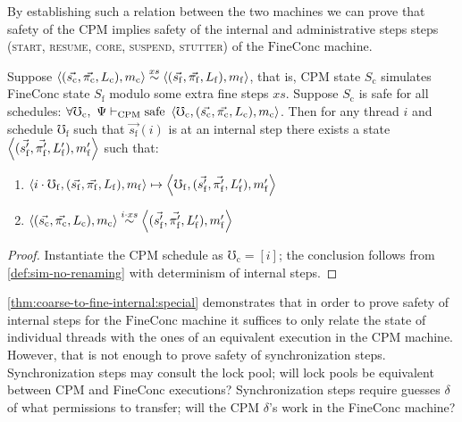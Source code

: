 By establishing such a relation between the two machines we can prove
that safety of the $\mathrm{CPM}$ implies safety of the internal and administrative steps
steps (\textsc{start, resume, core, suspend, stutter})
 of the $\mathrm{FineConc}$ machine.

\begin{lemma}
  \label{thm:coarse-to-fine-internal:special}
  Suppose
  $\left<(\vec{s_\mathrm{c}}, \vec{\pi_\mathrm{c}},
    L_\mathrm{c}), m_\mathrm{c} \right>
  \stackrel{xs}{\sim} \left<(\vec{s_\mathrm{f}},
  \vec{\pi_\mathrm{f}}, L_\mathrm{f}), m_\mathrm{f}\right>$,
  that is,
  CPM state $S_\mathrm{c}$ simulates FineConc state $S_\mathrm{f}$
  modulo some extra fine steps $xs$.
   Suppose $S_\mathrm{c}$ is safe for all schedules:\newline
  $\forall \mho_\mathrm{c},~ \Psi \vdash_\mathrm{CPM}
  \mathrm{safe}~\left<\mho_\mathrm{c},(\vec{s_\mathrm{c}},\vec{\pi_\mathrm{c}},L_\mathrm{c}),m_\mathrm{c}\right>$.
  Then for any thread $i$ and schedule
  $\mho_\mathrm{f}$ such that $\vec{s_\mathrm{f}}(i)$ is at an
  internal step there exists a state
  $\left<(\vec{s'_\mathrm{f}}, \vec{\pi'_\mathrm{f}},
    L'_\mathrm{f}), m'_\mathrm{f}\right>$
  such that:
  \begin{enumerate}[topsep=0pt]
  \item
    $\left<i\cdot\mho_{\mathrm{f}},(\vec{s_\mathrm{f}},
      \vec{\pi_\mathrm{f}}, L_\mathrm{f}), m_\mathrm{f}\right>
    \mapsto \left<\mho_{\mathrm{f}},(\vec{s'_\mathrm{f}},
      \vec{\pi'_\mathrm{f}}, L'_\mathrm{f}),
      m'_\mathrm{f}\right>$
  \item
    $\left<(\vec{s_\mathrm{c}}, \vec{\pi_\mathrm{c}},
      L_\mathrm{c}), m_\mathrm{c} \right> \stackrel{i \cdot
      xs}{\sim} \left<(\vec{s'_\mathrm{f}},
      \vec{\pi'_\mathrm{f}}, L'_\mathrm{f}),
      m'_\mathrm{f}\right>$
  \end{enumerate}
\end{lemma}
\begin{proof}
  Instantiate the CPM schedule as  $\mho_\mathrm{c}\!\! = \!\![i]$;
  the conclusion follows from \autoref{def:sim-no-renaming}
  with determinism of internal steps.
\end{proof}

\autoref{thm:coarse-to-fine-internal:special} demonstrates that in order to
prove safety of internal steps for the $\mathrm{FineConc}$ machine it
suffices to only relate the state of individual threads with the ones
of an equivalent execution in the $\mathrm{CPM}$ machine. However,
that is not enough to prove safety of synchronization steps.
Synchronization steps may consult the lock pool;
will lock pools be equivalent between CPM and FineConc executions?
Synchronization steps require guesses $\delta$ of what
permissions to transfer; will the CPM $\delta$'s work in
the FineConc machine?

